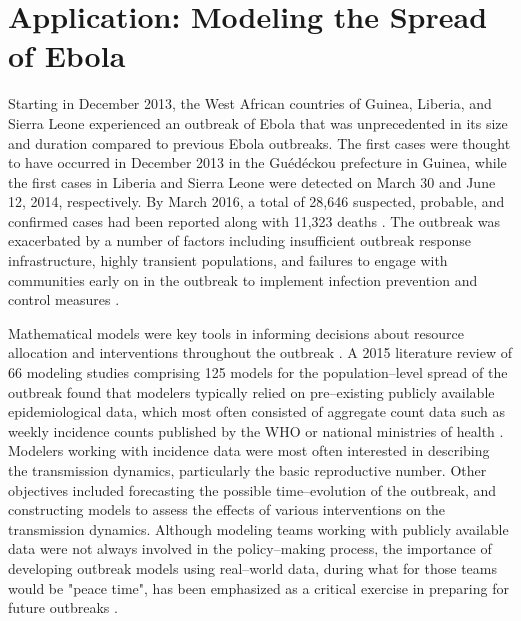 \section{Application: Modeling the Spread of Ebola}
\label{sec:lna_ebola}
Starting in December 2013, the West African countries of Guinea, Liberia, and Sierra Leone experienced an outbreak of Ebola that was unprecedented in its size and duration compared to previous Ebola outbreaks. The first cases were thought to have occurred in December 2013 in the Gu\'{e}d\'{e}ckou prefecture in Guinea, while the first cases in Liberia and Sierra Leone were detected on March 30 and June 12, 2014, respectively. By March 2016, a total of 28,646 suspected, probable, and confirmed cases had been reported along with 11,323 deaths \cite{who2016situation}. The outbreak was exacerbated by a number of factors including insufficient outbreak response infrastructure, highly transient populations, and failures to engage with communities early on in the outbreak to implement infection prevention and control measures \cite{coltart2017ebola,dudas2017virus}. 

Mathematical models were key tools in informing decisions about resource allocation and interventions throughout the outbreak \cite{coltart2017ebola}. A 2015 literature review of 66 modeling studies comprising 125 models for the population--level spread of the outbreak found that modelers typically relied on pre--existing publicly available epidemiological data, which most often consisted of aggregate count data such as weekly incidence counts published by the WHO or national ministries of health \cite{chretien2015mathematical}. Modelers working with incidence data were most often interested in describing the transmission dynamics, particularly the basic reproductive number. Other objectives included forecasting the possible time--evolution of the outbreak, and constructing models to assess the effects of various interventions on the transmission dynamics. Although modeling teams working with publicly available data were not always involved in the policy--making process, the importance of developing outbreak models using real--world data, during what for those teams would be "peace time", has been emphasized as a critical exercise in preparing for future outbreaks \cite{viboud2018rapidd}.

